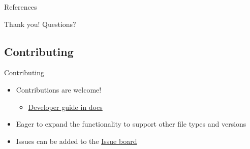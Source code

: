 \begin{frame}{References}
    
      
\end{frame}

\begin{frame}{Thank you!}
    Questions?
\end{frame}

\appendix
\backupbegin

\subsection{Contributing}
\begin{frame}{Contributing}
    \begin{itemize}
        \item Contributions are welcome!
            \begin{itemize}
                \item \href{https://serpent-tools.readthedocs.io/en/latest/develop/index.html}{Developer guide in docs}
            \end{itemize}
        \item Eager to expand the functionality to support other file types and \sss versions
        \item Issues can be added to the \href{https://github.com/CORE-GATECH-GROUP/serpent-tools/issues}{Issue board}
    \end{itemize}
\end{frame}

